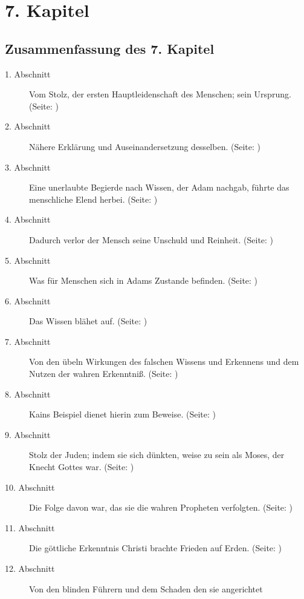 

\chapter{7. Kapitel} \label{kap7}

\section{Zusammenfassung des 7. Kapitel}
\footnotesize
\begin{description}
\item[1. Abschnitt] Vom Stolz, der ersten Hauptleidenschaft des Menschen; sein
Ursprung. (Seite: \pageref{kap7_ab1})
\item[2. Abschnitt]  Nähere Erklärung und Auseinandersetzung desselben. (Seite: \pageref{kap7_ab2})
\item[3. Abschnitt] Eine unerlaubte Begierde nach Wissen, der Adam nachgab,
führte das menschliche Elend herbei. (Seite: \pageref{kap7_ab3})
\item[4. Abschnitt] Dadurch verlor der Mensch seine Unschuld und Reinheit. (Seite: \pageref{kap7_ab4})
\item[5. Abschnitt] Was für Menschen sich in Adams Zustande befinden. (Seite: \pageref{kap7_ab5})
\item[6. Abschnitt] Das Wissen blähet auf. (Seite: \pageref{kap7_ab6})
\item[7. Abschnitt] Von den übeln Wirkungen des falschen Wissens und Erkennens
und dem Nutzen der wahren Erkenntniß. (Seite: \pageref{kap7_ab7})
\item[8. Abschnitt] Kains Beispiel dienet hierin zum Beweise. (Seite: \pageref{kap7_ab8})
\item[9. Abschnitt] Stolz der Juden; indem sie sich dünkten, weise zu sein als
Moses, der Knecht Gottes war. (Seite: \pageref{kap7_ab9})
\item[10. Abschnitt] Die Folge davon war, das sie die wahren Propheten
verfolgten. (Seite: \pageref{kap7_ab10})
\item[11. Abschnitt] Die göttliche Erkenntnis Christi brachte Frieden auf Erden. (Seite: \pageref{kap7_ab11})
\item[12. Abschnitt] Von den blinden Führern und dem Schaden den sie angerichtet

\end{description}
